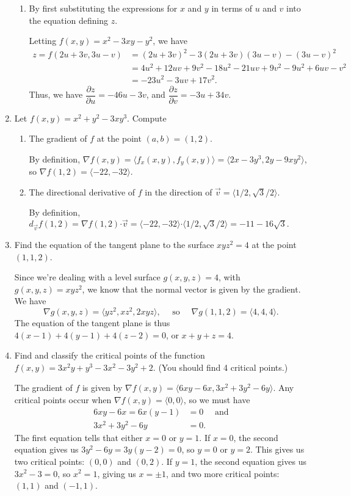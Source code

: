 \documentclass[letterpaper,12pt]{article}
\newcommand{\pd}[2]{\dfrac{\partial #1}{\partial #2}}
\newcommand{\dotp}{\boldsymbol{\cdot}}
\begin{document}
\begin{enumerate}
\begin{enumerate}
 \item By first substituting the expressions for $x$ and $y$ in terms of $u$ and $v$ into the equation defining $z$.

Letting $f(x,y) = x^2-3xy-y^2$, we have 
\begin{align*}
 z = f(2u+3v,3u-v) &= (2u+3v)^2-3(2u+3v)(3u-v)-(3u-v)^2 \\
 &= 4u^2+12uv+9v^2-18u^2-21uv+9v^2-9u^2+6uv-v^2\\
 & = -23u^2-3uv+17v^2.
\end{align*}
Thus, we have $\pd{z}{u} = -46u-3v$, and $\pd{z}{v} = -3u+34v$.
\end{enumerate}

 \item Let $f(x,y)=x^2+y^2-3xy^3$. Compute
\begin{enumerate}
 \item The gradient of $f$ at the point $(a,b)=(1,2)$.

\bigskip

By definition, $\nabla f(x,y) = \langle f_x(x,y), f_y(x,y)\rangle  = \langle 2x-3y^3, 2y-9xy^2\rangle$, so $\nabla f(1,2) = \langle -22, -32\rangle$.
 
 \item The directional derivative of $f$ in the direction of $\vec{v} = \langle 1/2, \sqrt{3}/2\rangle$.

\bigskip

By definition, $d_{\vec{v}}f(1,2) = \nabla f(1,2)\dotp \vec{v} = \langle -22, -32\rangle\dotp \langle 1/2, \sqrt{3}/2\rangle = -11-16\sqrt{3}.$

\end{enumerate}
 \item Find the equation of the tangent plane to the surface $xyz^2=4$ at the point $(1,1,2)$.

\bigskip

Since we're dealing with a level surface $g(x,y,z)=4$, with $g(x,y,z)=xyz^2$, we know that the normal vector is given by the gradient. We have
\[
 \nabla g(x,y,z) = \langle yz^2, xz^2, 2xyz\rangle, \quad \text{ so } \quad \nabla g (1,1,2) = \langle 4, 4, 4\rangle.
\]
The equation of the tangent plane is thus $4(x-1)+4(y-1)+4(z-2)=0$, or $x+y+z=4$.

 \item Find and classify the critical points of the function $f(x,y) = 3x^2y+y^3-3x^2-3y^2+2$. (You should find 4 critical points.)

\bigskip

The gradient of $f$ is given by $\nabla f(x,y) = \langle 6xy-6x, 3x^2+3y^2-6y\rangle$. Any critical points occur when $\nabla f(x,y) = \langle 0,0\rangle$, so we must have
\begin{align*}
 6xy-6x=6x(y-1)&=0 \quad \text{ and}\\
3x^2+3y^2-6y&= 0.
\end{align*}
The first equation tells that either $x=0$ or $y=1$. If $x=0$, the second equation gives us $3y^2-6y=3y(y-2)=0$, so $y=0$ or $y=2$. This gives us two critical points: $(0,0)$ and $(0,2)$. If $y=1$, the second equation gives us $3x^2-3=0$, so $x^2=1$, giving us $x=\pm 1$, and two more critical points: $(1,1)$ and $(-1,1)$.


\end{enumerate}
\end{document}
